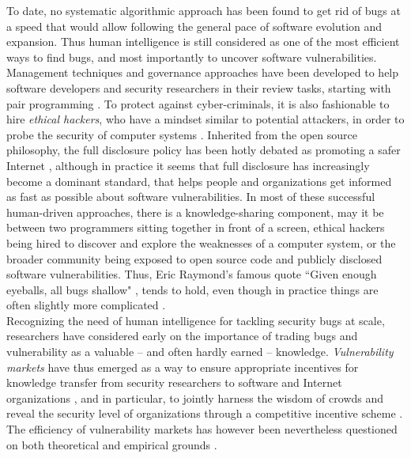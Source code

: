 To date, no systematic algorithmic approach has been found to get rid of bugs at a speed that would allow following the general pace of software evolution and expansion. Thus human intelligence is still considered as one of the most efficient ways to find bugs, and most importantly to uncover software vulnerabilities. Management techniques and governance approaches have been developed to help software developers and security researchers in their review tasks, starting with  pair programming \cite{hulkko2005multiple}. To protect against cyber-criminals, it is also fashionable to hire {\it ethical hackers}, who have a mindset similar to potential attackers, in order to probe the security of computer systems \cite{smith2002ethical,saleem2006ethical,bishop2007penetration}. Inherited from the open source philosophy, the full disclosure policy has been hotly debated as promoting a safer Internet \cite{arora2008optimal}, although in practice it seems that full disclosure has increasingly become a dominant standard, that helps people and organizations get informed as fast as possible about software vulnerabilities. In most of these successful human-driven approaches, there is a knowledge-sharing component, may it be between two programmers sitting together in front of a screen, ethical hackers being hired to discover and explore the weaknesses of a computer system, or the broader community being exposed to open source code and publicly disclosed software vulnerabilities. Thus, Eric Raymond's famous quote ``Given enough eyeballs, all bugs shallow" \cite{raymond1999cathedral}, tends to hold, even though in practice things are often slightly more complicated \cite{hafiz2015game}.\\

Recognizing the need of human intelligence for tackling security bugs at scale, researchers have considered early on the importance of trading bugs and vulnerability as a valuable -- and often hardly earned -- knowledge. {\it Vulnerability markets} have thus emerged as a way to ensure appropriate incentives for knowledge transfer from security researchers to software and Internet organizations \cite{camp2004pricing}, and in particular, to jointly harness the wisdom of crowds and reveal the security level of organizations through a competitive incentive scheme \cite{schechter2002buy}. The efficiency of vulnerability markets has however been nevertheless questioned on both theoretical \cite{kannan2005market,mckinney2007vulnerability} and empirical grounds \cite{ransbotham2008markets,algarni2014software}.\\


